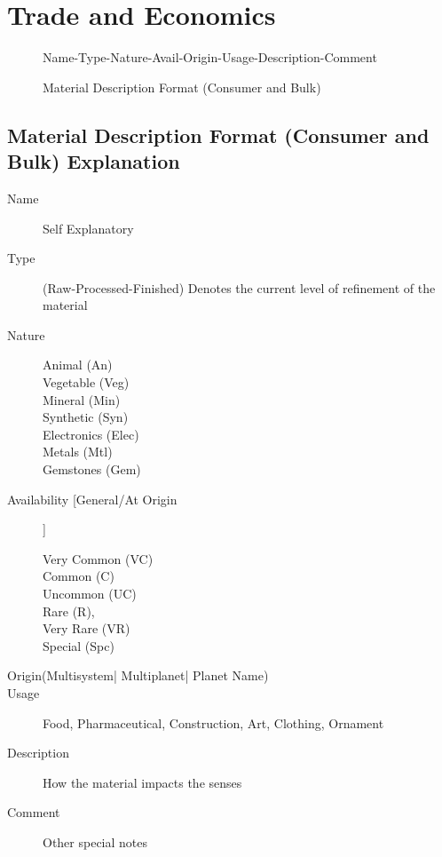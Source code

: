 \chapter{Trade and Economics}

\begin{figure}[htb]
\caption{Material Description Format  (Consumer and Bulk)}
Name-Type-Nature-Avail-Origin-Usage-Description-Comment
\end{figure}

\section{Material Description Format  (Consumer and Bulk) Explanation}

\begin{description}
	\item[Name]
	Self Explanatory
	\item[Type]
	(Raw-Processed-Finished)
	Denotes the current level of refinement of the material
	\item[Nature]
	\begin{description}
		\item[Animal (An)]
		\item[Vegetable (Veg)]
		\item[Mineral (Min)]
		\item[Synthetic (Syn)]
		\item[Electronics (Elec)]
		\item[Metals (Mtl)]
		\item[Gemstones (Gem)]
	\end{description}
	\item[Availability [General/At Origin] ]
	\begin{description}
		\item[Very Common (VC)]
		\item[Common (C)]
		\item[Uncommon (UC)]
		\item[Rare (R), ]
		\item[Very Rare (VR)]
		\item[Special (Spc)  ]
	\end{description}
	\item[Origin(Multisystem| Multiplanet| Planet Name)]
	\item[Usage]
	Food, Pharmaceutical, Construction, Art, Clothing, Ornament
	\item[Description]
	How the material impacts the senses
	\item[Comment]
	Other special notes
\end{description}



